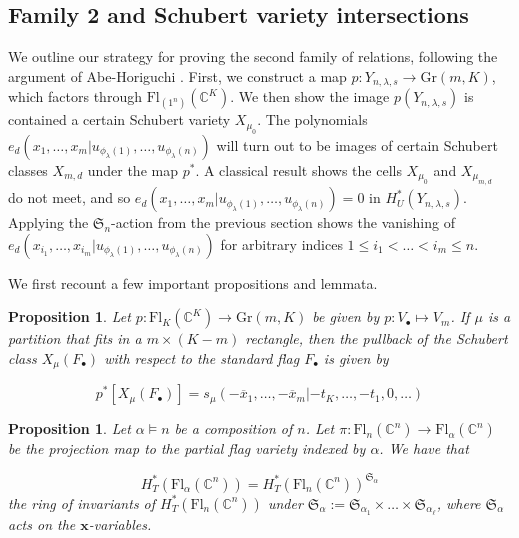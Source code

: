 \documentclass[11pt]{amsart}
\numberwithin{equation}{section}
\newtheorem{proposition}[theorem]{Proposition}
\theoremstyle{definition}
\newcommand{\symm}{{\mathfrak{S}}}
\newcommand{\Gr}{{\mathrm {Gr}}}
\newcommand{\CC}{{\mathbb{C}}}
\newcommand{\xxx}{{\mathbf{x}}}
\newcommand{\Fl}{\text{Fl}}
\begin{document}
\subsection{Family 2 and Schubert variety intersections}

We outline our strategy for proving the second family of relations, following the argument of Abe-Horiguchi \cite{AH}. First, we construct a map $p: Y_{n,\lambda,s} \to \Gr(m,K)$, which factors through $\Fl_{(1^n)}(\CC^K)$. We then show the image $p(Y_{n,\lambda,s})$ is contained a certain Schubert variety $X_{\mu_0}$. The polynomials $e_d(x_1,\dots,x_m| u_{\phi_\lambda(1)},\dots,u_{\phi_\lambda(n)})$ will turn out to be images of certain Schubert classes $X_{m,d}$ under the map $p^*$. A classical result shows the cells $X_{\mu_0}$ and $X_{\mu_{m,d}}$ do not meet, and so $e_d(x_1,\dots,x_m| u_{\phi_\lambda(1)},\dots,u_{\phi_\lambda(n)}) = 0$ in $H^*_U(Y_{n,\lambda,s})$. Applying the $\symm_n$-action from the previous section shows the vanishing of $e_d(x_{i_1},\dots,x_{i_m}| u_{\phi_\lambda(1)},\dots,u_{\phi_\lambda(n)})$ for arbitrary indices $1 \leq i_1 < \dots < i_m \leq n$.

We first recount a few important propositions and lemmata.

\begin{proposition}\label{prop: pullback-schub}
    Let $p: \Fl_K(\CC^K) \to \Gr(m,K)$ be given by $p: V_\bullet \mapsto V_m$. If $\mu$ is a partition that fits in a $m \times (K-m)$ rectangle, then the pullback of the Schubert class $X_\mu(F_\bullet)$ with respect to the standard flag $F_\bullet$ is given by

    \begin{equation}\label{eq: pullback-schub}
        p^*[X_\mu(F_\bullet)] = s_\mu(-\overline{x}_1,\dots,-\overline{x}_m|-t_K,\dots,-t_1,0,\dots)
    \end{equation}
\end{proposition}

\begin{proposition}\label{prop: parabolic-inclusion}\cite{AF}
    Let $\alpha \vDash n$ be a composition of $n$. Let $\pi: \Fl_n(\CC^n) \to \Fl_\alpha(\CC^n)$ be the projection map to the partial flag variety indexed by $\alpha$. We have that

    \begin{equation}\label{eq: parabolic-inclusion}
        H^*_T(\Fl_\alpha(\CC^n)) = H^*_T(\Fl_n(\CC^n))^{\symm_\alpha}
    \end{equation}
    the ring of invariants of $H^*_T(\Fl_n(\CC^n))$ under $\symm_\alpha := \symm_{\alpha_1} \times \dots \times \symm_{\alpha_\ell}$, where $\symm_\alpha$ acts on the $\xxx$-variables.
\end{proposition}
\end{document}
